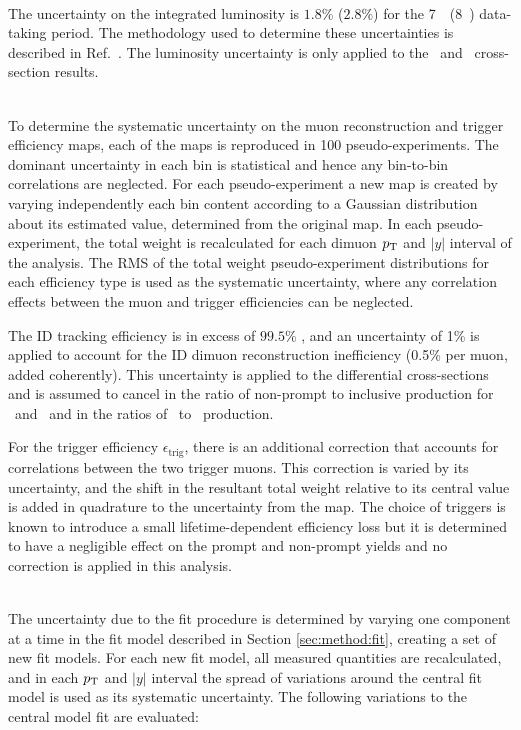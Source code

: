 \begin{description}[style=unboxed,leftmargin=0cm]
\item[Luminosity] \hfill \\
The uncertainty on the integrated luminosity is $1.8\%$ ($2.8\%$) for the 7~\TeV\ (8~\TeV) data-taking period.  
The methodology used to determine these uncertainties is described in Ref.~\cite{Aad:2013ucp}.
The luminosity uncertainty is only applied to the \jpsi\ and \psiprime\ cross-section results.


\item[Muon reconstruction and trigger efficiencies] \hfill \\
To determine the systematic uncertainty on the muon reconstruction and trigger efficiency maps, each of the maps is reproduced in 100 pseudo-experiments.
The dominant uncertainty in each bin is statistical and hence any bin-to-bin correlations are neglected.
For each pseudo-experiment a new map is created by varying independently each bin content according to a Gaussian distribution about its estimated value, 
determined from the original map.
In each pseudo-experiment, the total weight is recalculated for each dimuon $\mbox{$p_{\text{T}}$}$ and $|y|$ interval of the analysis.
The RMS of the total weight pseudo-experiment distributions for each efficiency type is used as the systematic uncertainty,
where any correlation effects between the muon and trigger efficiencies can be neglected.


The ID tracking efficiency is in excess of $99.5\%$ \cite{Aad2012dlq}, and
an uncertainty of 1\% is applied to account for the ID dimuon reconstruction inefficiency (0.5\% per muon, added coherently). This
uncertainty is applied to the differential cross-sections and is assumed to cancel in the ratio of non-prompt to inclusive production for \jpsi\ and 
\psiprime\ and in the ratios of \psiprime\ to \jpsi\ production.

For the trigger efficiency  $\epsilon_\mathrm{trig}$, there is an additional correction that accounts for correlations between the two trigger muons. This 
correction is varied by its uncertainty, and the shift in the resultant total weight relative to its central value is added in quadrature to the uncertainty from the map.
The choice of triggers is known \cite{Aad:2014cqa} to introduce a small lifetime-dependent efficiency loss but it is determined to have a negligible effect on 
the prompt and non-prompt yields and no correction is applied in this analysis.

  \item[Fit model uncertainty] \hfill \\
The uncertainty due to the fit procedure is determined by varying one component at a
time in the fit model described in Section \ref{sec:method:fit}, creating a set of new fit models. For each new
fit model, all measured quantities are recalculated, and in each $\mbox{$p_{\text{T}}$}$ and $|y|$ interval the spread of
variations around the central fit model is used as its systematic uncertainty.
The following variations to the central model fit are evaluated: 


\end{description}
